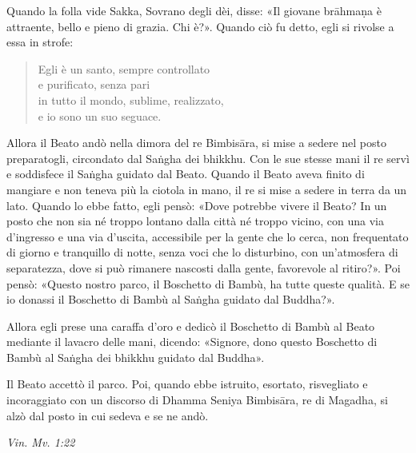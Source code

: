 Quando la folla vide Sakka, Sovrano degli dèi, disse: «Il giovane
brāhmaṇa è attraente, bello e pieno di grazia. Chi è?». Quando ciò fu
detto, egli si rivolse a essa in strofe:


\begin{quote}
Egli è un santo, sempre controllato \\
e purificato, senza pari \\
in tutto il mondo, sublime, realizzato, \\
e io sono un suo seguace.
\end{quote}

Allora il Beato andò nella dimora del re Bimbisāra, si mise a sedere nel
posto preparatogli, circondato dal Saṅgha dei bhikkhu. Con le sue stesse
mani il re servì e soddisfece il Saṅgha guidato dal Beato. Quando il
Beato aveva finito di mangiare e non teneva più la ciotola in mano, il
re si mise a sedere in terra da un lato. Quando lo ebbe fatto, egli
pensò: «Dove potrebbe vivere il Beato? In un posto che non sia né troppo
lontano dalla città né troppo vicino, con una via d’ingresso e una via
d’uscita, accessibile per la gente che lo cerca, non frequentato di
giorno e tranquillo di notte, senza voci che lo disturbino, con
un’atmosfera di separatezza, dove si può rimanere nascosti dalla gente,
favorevole al ritiro?». Poi pensò: «Questo nostro parco, il Boschetto di
Bambù, ha tutte queste qualità. E se io donassi il Boschetto di Bambù al
Saṅgha guidato dal Buddha?».


Allora egli prese una caraffa d’oro e dedicò il Boschetto di Bambù al
Beato mediante il lavacro delle mani, dicendo: «Signore, dono questo
Boschetto di Bambù al Saṅgha dei bhikkhu guidato dal Buddha».


Il Beato accettò il parco. Poi, quando ebbe istruito, esortato,
risvegliato e incoraggiato con un discorso di Dhamma Seniya Bimbisāra,
re di Magadha, si alzò dal posto in cui sedeva e se ne andò.


\emph{Vin. Mv. 1:22}


